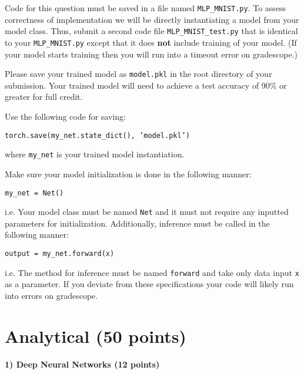\documentclass[11pt]{article}
\begin{document}
	Code for this question must be saved in a file named \texttt{MLP\_MNIST.py}. To assess correctness of implementation we will be directly instantiating a model from your model class. Thus, submit a second code file \texttt{MLP\_MNIST\_test.py} that is identical to your \texttt{MLP\_MNIST.py} except that it does \textbf{not} include training of your model. (If your model starts training then you will run  into a timeout error on gradescope.)
	
	Please save your trained model as \texttt{model.pkl} in the root directory of your submission. Your trained model will need to achieve a test accuracy of 90\% or greater for full credit.
	
	Use the following code for saving:
	
	\texttt{torch.save(my\_net.state\_dict(), 'model.pkl')}
	
	where \texttt{my\_net} is your trained model instantiation. 
	
	Make sure your model initialization is done in the following manner:
	
	\texttt{my\_net = Net()}
	
	i.e. Your model class must be named \texttt{Net} and it must not require any inputted parameters for initialization. Additionally, inference must be called in the following manner:
	
	\texttt{output = my\_net.forward(x)}
	
	i.e. The method for inference must be named \texttt{forward} and take only data input \texttt{x} as a parameter.
	If you deviate from these specifications your code will likely run into errors on gradescope.
	
	\section{Analytical (50 points)}
	
	\paragraph{1) Deep Neural Networks (12 points)}
	
\end{document}
